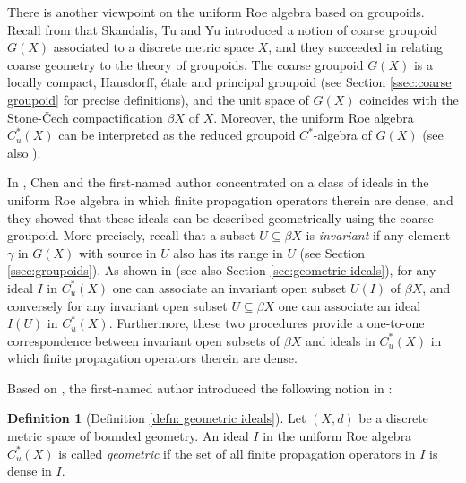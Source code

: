 \documentclass[12pt, a4paper]{amsart}
\numberwithin{equation}{section}
\theoremstyle{definition}
\newtheorem{alphdefn}[alphthm]{Definition}			%
\theoremstyle{remark}
\begin{document}
There is another viewpoint on the uniform Roe algebra based on groupoids. Recall from \cite{STY02} that Skandalis, Tu and Yu introduced a notion of coarse groupoid $G(X)$ associated to a discrete metric space $X$, and they succeeded in relating coarse geometry to the theory of groupoids. The coarse groupoid $G(X)$ is a locally compact, Hausdorff, \'{e}tale and principal groupoid (see Section \ref{ssec:coarse groupoid} for precise definitions), and the unit space of $G(X)$ coincides with the Stone-\v{C}ech compactification $\beta X$ of $X$. Moreover, the uniform Roe algebra $C^*_u(X)$ can be interpreted as the reduced groupoid $C^*$-algebra of $G(X)$ (see also \cite[Chapter 10]{Roe03}). 





In \cite{CW04}, Chen and the first-named author concentrated on a class of ideals in the uniform Roe algebra in which finite propagation operators therein are dense, and they showed that these ideals can be described geometrically using the coarse groupoid. More precisely, recall that a subset $U \subseteq \beta X$ is \emph{invariant} if any element $\gamma$ in $G(X)$ with source in $U$ also has its range in $U$ (see Section \ref{ssec:groupoids}). As shown in \cite{CW04} (see also Section \ref{sec:geometric ideals}), for any ideal $I$ in $C^*_u(X)$ one can associate an invariant open subset $U(I)$ of $\beta X$, and conversely for any invariant open subset $U \subseteq \beta X$ one can associate an ideal $I(U)$ in $C^*_u(X)$. Furthermore, these two procedures provide a one-to-one correspondence between invariant open subsets of $\beta X$ and ideals in $C^*_u(X)$ in which finite propagation operators therein are dense.



Based on \cite{CW04}, the first-named author introduced the following notion in \cite[Definition 1.4]{Wan07}:


\begin{alphdefn}[Definition \ref{defn: geometric ideals}]\label{introdefn:geometric ideals}
Let $(X, d)$ be a discrete metric space of bounded geometry. An ideal $I$ in the uniform Roe algebra $C^*_u(X)$ is called \emph{geometric} if the set of all finite propagation operators in $I$ is dense in $I$.
\end{alphdefn}
\end{document}
